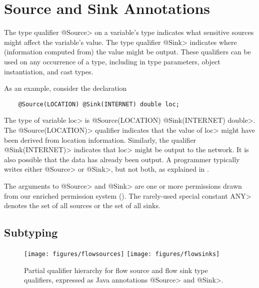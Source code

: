 



\section{Source and Sink Annotations\label{sec:flow-type-system}}


The type qualifier \<@Source> on a variable's
type indicates what sensitive sources might affect the variable's value.
The type qualifier \<@Sink> indicates where (information computed from) the
value might be output.
These qualifiers can be used on any occurrence
of a type, including in type parameters, object instantiation, and cast types.


As an example, consider the declaration

\begin{Verbatim}
    @Source(LOCATION) @Sink(INTERNET) double loc;
\end{Verbatim}

\noindent
The type of variable \<loc> is \<@Source(LOCATION) @Sink(INTERNET)
double>.
The \<@Source(LOCATION)> qualifier indicates that the
value of \<loc> might have been derived from
location information.
Similarly, the qualifier \<@Sink(INTERNET)> indicates that
\<loc> might be output to the network.  It is also
possible that the data has already been output.
A programmer typically writes either \<@Source> or \<@Sink>, but not both, as explained
in  . 

The arguments to \<@Source> and \<@Sink> are one or more permissions
drawn from our enriched permission system ().
The rarely-used special constant \<ANY> denotes the set of all sources or the set of all
sinks.


\subsection{Subtyping\label{sec:subtyping}}

\begin{figure}
\centerline{\texttt{[image: figures/flowsources]}%
  \hfill%
  \texttt{[image: figures/flowsinks]}}
\caption{Partial qualifier hierarchy for flow source and flow sink type
  qualifiers, expressed as Java annotations \<@Source> and \<@Sink>.}
\label{fig:flow-hierarchy}
\end{figure}



